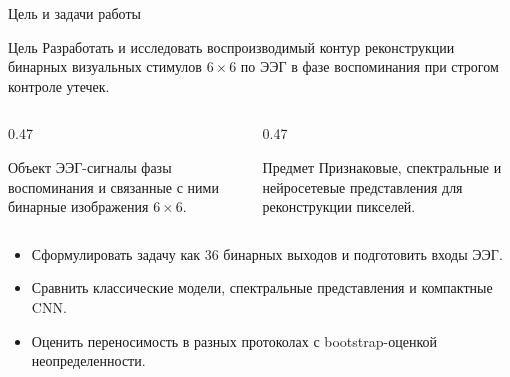 \documentclass[aspectratio=169,10pt]{beamer}
\begin{document}
\begin{frame}{Цель и задачи работы}
  \begin{block}{Цель}
    Разработать и исследовать воспроизводимый контур реконструкции бинарных визуальных стимулов $6\times6$ по ЭЭГ в фазе воспоминания при строгом контроле утечек.
  \end{block}
  \begin{columns}[T,totalwidth=\textwidth]
    \begin{column}{0.47\textwidth}
      \begin{block}{Объект}
        ЭЭГ-сигналы фазы воспоминания и связанные с ними бинарные изображения $6\times6$.
      \end{block}
    \end{column}
    \begin{column}{0.47\textwidth}
      \begin{block}{Предмет}
        Признаковые, спектральные и нейросетевые представления для реконструкции пикселей.
      \end{block}
    \end{column}
  \end{columns}
  \vspace{0.4em}
  \small
  \begin{itemize}
    \item Сформулировать задачу как 36 бинарных выходов и подготовить входы ЭЭГ.
    \item Сравнить классические модели, спектральные представления и компактные CNN.
    \item Оценить переносимость в разных протоколах с bootstrap-оценкой неопределенности.
  \end{itemize}
\end{frame}
\end{document}
